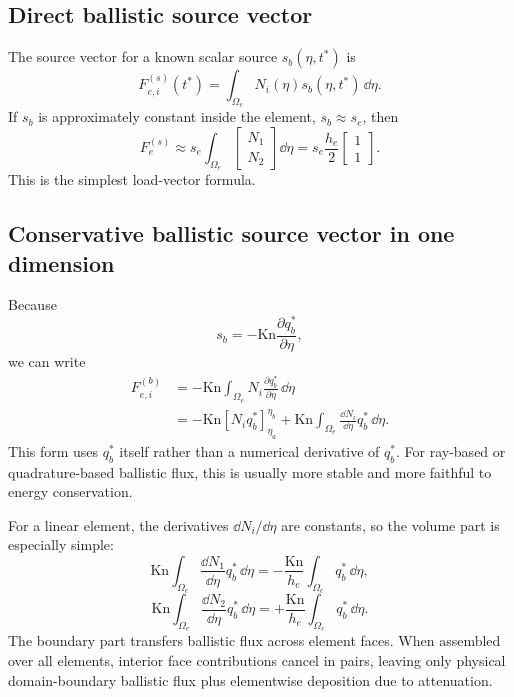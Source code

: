 \documentclass[11pt]{article}
\begin{document}
\subsection{Direct ballistic source vector}
The source vector for a known scalar source \(s_b(\eta,t^*)\) is
\begin{equation}
    \boxed{F_{e,i}^{(s)}(t^*)=\int_{\Omega_e}N_i(\eta)s_b(\eta,t^*)\,\dd\eta.}
    \label{eq:element_source_def}
\end{equation}
If \(s_b\) is approximately constant inside the element, \(s_b\approx s_e\), then
\begin{equation}
    F_e^{(s)}\approx s_e\int_{\Omega_e}
    \begin{bmatrix}
    N_1\\N_2
    \end{bmatrix}\dd\eta
    =s_e\frac{h_e}{2}
    \begin{bmatrix}
    1\\1
    \end{bmatrix}.
    \label{eq:constant_source_vector}
\end{equation}
This is the simplest load-vector formula.

\subsection{Conservative ballistic source vector in one dimension}
Because
\begin{equation}
    s_b=-\mathrm{Kn}\frac{\partial q_b^*}{\partial\eta},
\end{equation}
we can write
\begin{align}
    F_{e,i}^{(b)}
    &=-\mathrm{Kn}\int_{\Omega_e}N_i\frac{\partial q_b^*}{\partial\eta}\,\dd\eta\\
    &=-\mathrm{Kn}\left[N_iq_b^*\right]_{\eta_a}^{\eta_b}
    +\mathrm{Kn}\int_{\Omega_e}\frac{\dd N_i}{\dd\eta}q_b^*\,\dd\eta.
    \label{eq:conservative_1d_ballistic_load}
\end{align}
This form uses \(q_b^*\) itself rather than a numerical derivative of \(q_b^*\). For ray-based or quadrature-based ballistic flux, this is usually more stable and more faithful to energy conservation.

For a linear element, the derivatives \(\dd N_i/\dd\eta\) are constants, so the volume part is especially simple:
\begin{equation}
    \mathrm{Kn}\int_{\Omega_e}\frac{\dd N_1}{\dd\eta}q_b^*\,\dd\eta
    =-\frac{\mathrm{Kn}}{h_e}\int_{\Omega_e}q_b^*\,\dd\eta,
\end{equation}
\begin{equation}
    \mathrm{Kn}\int_{\Omega_e}\frac{\dd N_2}{\dd\eta}q_b^*\,\dd\eta
    =+\frac{\mathrm{Kn}}{h_e}\int_{\Omega_e}q_b^*\,\dd\eta.
\end{equation}
The boundary part transfers ballistic flux across element faces. When assembled over all elements, interior face contributions cancel in pairs, leaving only physical domain-boundary ballistic flux plus elementwise deposition due to attenuation.
\end{document}
